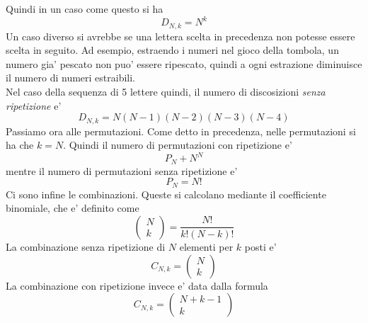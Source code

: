 \documentclass[12pt]{article}
\begin{document}
Quindi in un caso come questo si ha 
$$
	D_{N,k} = N^k
$$
Un caso diverso si avrebbe se una lettera scelta in precedenza non potesse essere scelta in seguito. Ad esempio, estraendo i numeri nel gioco della tombola, un numero gia' pescato non puo' essere ripescato, quindi a ogni estrazione diminuisce il numero di numeri estraibili. \\
Nel caso della sequenza di 5 lettere quindi, il numero di discosizioni \textit{senza ripetizione} e'
$$
	D_{N,k} = N(N-1)(N-2)(N-3)(N-4)
$$  
Passiamo ora alle permutazioni. Come detto in precedenza, nelle permutazioni si ha che $k = N$. Quindi il numero di permutazioni con ripetizione e'
$$
	P_N + N^N
$$
mentre il numero di permutazioni senza ripetizione e'
$$
	P_N = N!
$$
Ci sono infine le combinazioni. Queste si calcolano mediante il coefficiente binomiale, che e' definito come
$$
	\begin{pmatrix}
		N \\
		k
	\end{pmatrix} = \frac{N!}{k!(N-k)!}
$$
La combinazione senza ripetizione di $N$ elementi per $k$ posti e'
$$
	C_{N,k} = \begin{pmatrix}
		N \\
		k
	\end{pmatrix}  
$$
La combinazione con ripetizione invece e' data dalla formula
$$
	C_{N,k} = \begin{pmatrix}
		N + k - 1 \\
		k
	\end{pmatrix}  
$$
\end{document}
